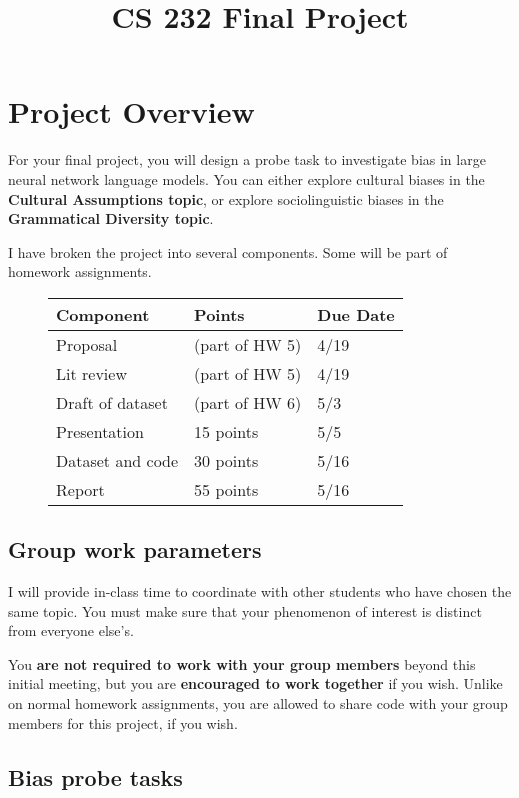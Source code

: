 \documentclass[12pt,table]{article}
\title{CS 232 Final Project}
\author{\vspace{-10ex}}
\date{\vspace{-5ex}}
\begin{document}
\maketitle{}

\section{Project Overview}

For your final project, you will design a probe task to investigate bias in large neural network language models. You can either explore cultural biases in the \textbf{Cultural Assumptions topic}, or explore sociolinguistic biases in the \textbf{Grammatical Diversity topic}.

I have broken the project into several components. Some will be part of homework assignments.

\begin{figure}[H]
\centering
\Large{
\begin{tabular}{|lll|}\hline
Component&Points&Due Date\\\hline
Proposal&(part of HW 5)&4/19\\
Lit review&(part of HW 5)&4/19\\
Draft of dataset&(part of HW 6)&5/3\\
Presentation&15 points&5/5\\
Dataset and code&30 points&5/16\\
Report&55 points&5/16\\\hline
\end{tabular}}
\end{figure}

\subsection{Group work parameters}

I will provide in-class time to coordinate with other students who have chosen the same topic. You must make sure that your phenomenon of interest is distinct from everyone else's. 

You \textbf{are not required to work with your group members} beyond this initial meeting, but you are \textbf{encouraged to work together} if you wish. Unlike on normal homework assignments, you are allowed to share code with your group members for this project, if you wish.

\subsection{Bias probe tasks}
\end{document}

